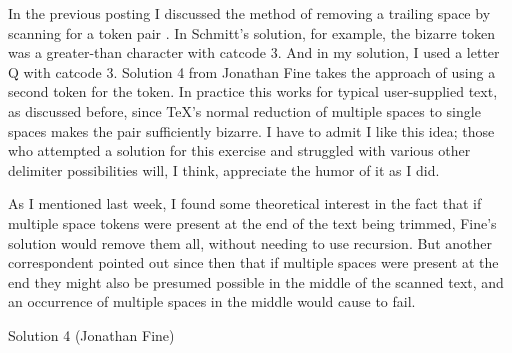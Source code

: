 
In the previous posting I discussed the method of removing a trailing
space by scanning for a token pair . In Schmitt's
solution, for example, the bizarre token was a greater-than character
with catcode 3. And in my solution, I used a letter Q with catcode
3. Solution 4 from Jonathan Fine takes the approach of using a second
 token for the  token. In practice this works for
typical user-supplied text, as discussed before, since TeX's normal
reduction of multiple spaces to single spaces makes the pair
 sufficiently bizarre. I have to admit I like this idea;
those who attempted a solution for this exercise and struggled with
various other delimiter possibilities will, I think, appreciate the
humor of it as I did.

As I mentioned last week, I found some theoretical interest in the
fact that if multiple space tokens were present at the end of the text
being trimmed, Fine's solution would remove them all, without needing
to use recursion. But another correspondent pointed out since then
that if multiple spaces were present at the end they might also be
presumed possible in the middle of the scanned text, and an occurrence
of multiple spaces in the middle would cause \cmd{\trim} to fail.



\begin{solution}{Solution 4 (Jonathan Fine)}
\end{solution}

